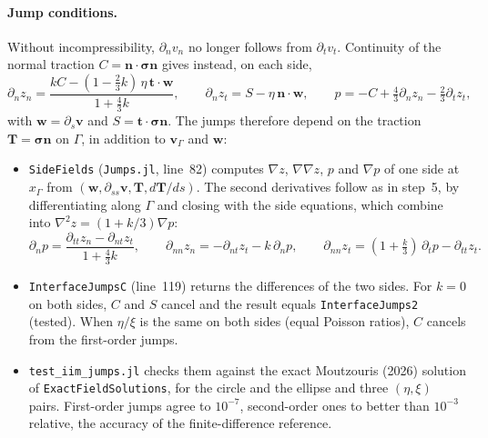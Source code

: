 \documentclass[11pt,a4paper]{article}
\newcommand{\code}[1]{\texttt{#1}}
\begin{document}
\paragraph{Jump conditions.} Without incompressibility, $\partial_nv_n$ no longer follows from
$\partial_tv_t$. Continuity of the normal traction $C=\mathbf n\cdot\boldsymbol\sigma\mathbf n$
gives instead, on each side,
\[
\partial_nz_n=\frac{kC-(1-\tfrac23k)\,\eta\,\mathbf t\cdot\mathbf w}{1+\tfrac43k},\qquad
\partial_nz_t=S-\eta\,\mathbf n\cdot\mathbf w,\qquad
p=-C+\tfrac43\partial_nz_n-\tfrac23\partial_tz_t,
\]
with $\mathbf w=\partial_s\mathbf v$ and $S=\mathbf t\cdot\boldsymbol\sigma\mathbf n$. The
jumps therefore depend on the traction $\mathbf T=\boldsymbol\sigma\mathbf n$ on $\Gamma$, in
addition to $\mathbf v_\Gamma$ and $\mathbf w$:
\begin{itemize}
  \item \code{SideFields} (\code{Jumps.jl}, line~82) computes $\nabla z$, $\nabla\nabla z$, $p$
    and $\nabla p$ of one side at $x_\Gamma$ from $(\mathbf w,\partial_{ss}\mathbf v,\mathbf T,
    d\mathbf T/ds)$. The second derivatives follow as in step~5, by differentiating along
    $\Gamma$ and closing with the side equations, which combine into $\nabla^2z=(1+k/3)\nabla p$:
    \[
    \partial_np=\frac{\partial_{tt}z_n-\partial_{nt}z_t}{1+\tfrac43k},\qquad
    \partial_{nn}z_n=-\partial_{nt}z_t-k\,\partial_np,\qquad
    \partial_{nn}z_t=(1+\tfrac k3)\,\partial_tp-\partial_{tt}z_t.
    \]
  \item \code{InterfaceJumpsC} (line~119) returns the differences of the two sides. For $k=0$
    on both sides, $C$ and $S$ cancel and the result equals \code{InterfaceJumps2} (tested).
    When $\eta/\xi$ is the same on both sides (equal Poisson ratios), $C$ cancels from the
    first-order jumps.
  \item \code{test\_iim\_jumps.jl} checks them against the exact Moutzouris (2026) solution
    of \code{ExactFieldSolutions}, for the circle and the ellipse and three $(\eta,\xi)$ pairs.
    First-order jumps agree to $10^{-7}$, second-order ones to better than $10^{-3}$ relative,
    the accuracy of the finite-difference reference.
\end{itemize}
\end{document}
